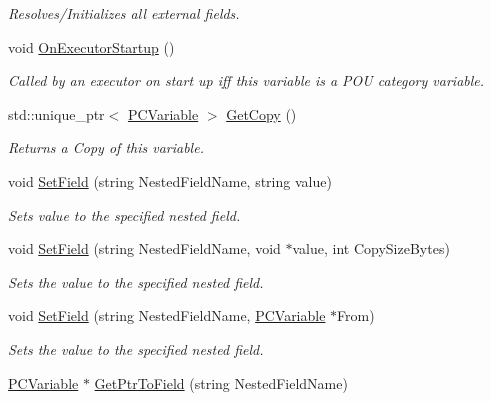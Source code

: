 \begin{DoxyCompactItemize}
\begin{DoxyCompactList}\small\item\em Resolves/\+Initializes all external fields. \end{DoxyCompactList}\item 
void \hyperlink{classpc__emulator_1_1PCVariable_aeb1865fe69b98603a85a8e9348ab8425}{On\+Executor\+Startup} ()
\begin{DoxyCompactList}\small\item\em Called by an executor on start up iff this variable is a P\+OU category variable. \end{DoxyCompactList}\item 
std\+::unique\+\_\+ptr$<$ \hyperlink{classpc__emulator_1_1PCVariable}{P\+C\+Variable} $>$ \hyperlink{classpc__emulator_1_1PCVariable_a011586ac325c4b82a4a229bedb2a431c}{Get\+Copy} ()
\begin{DoxyCompactList}\small\item\em Returns a Copy of this variable. \end{DoxyCompactList}\item 
void \hyperlink{classpc__emulator_1_1PCVariable_afca22c968e11157696a4b33a7f9bb793}{Set\+Field} (string Nested\+Field\+Name, string value)
\begin{DoxyCompactList}\small\item\em Sets value to the specified nested field. \end{DoxyCompactList}\item 
void \hyperlink{classpc__emulator_1_1PCVariable_afbd249e8f01275e8a4022d00d79fde9b}{Set\+Field} (string Nested\+Field\+Name, void $\ast$value, int Copy\+Size\+Bytes)
\begin{DoxyCompactList}\small\item\em Sets the value to the specified nested field. \end{DoxyCompactList}\item 
void \hyperlink{classpc__emulator_1_1PCVariable_adca5ba9cba15d7ede608033173ed71bc}{Set\+Field} (string Nested\+Field\+Name, \hyperlink{classpc__emulator_1_1PCVariable}{P\+C\+Variable} $\ast$From)
\begin{DoxyCompactList}\small\item\em Sets the value to the specified nested field. \end{DoxyCompactList}\item 
\hyperlink{classpc__emulator_1_1PCVariable}{P\+C\+Variable} $\ast$ \hyperlink{classpc__emulator_1_1PCVariable_acf54d7fc8a4a69377fe82e85585ca24f}{Get\+Ptr\+To\+Field} (string Nested\+Field\+Name)

\end{DoxyCompactItemize}
